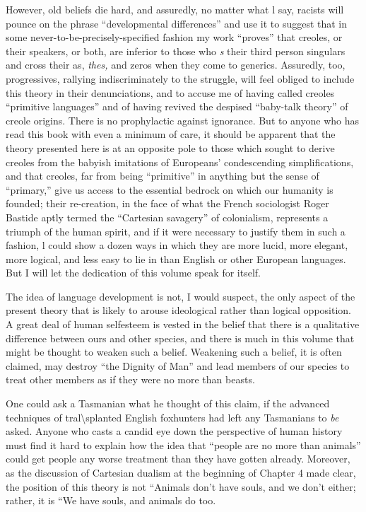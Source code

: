 However, old beliefs die hard, and assuredly, no matter what l say, racists will pounce on the phrase ``developmental differences'' and use it to suggest that in some never-to-be-precisely-specified fashion my work ``proves'' that creoles, or their speakers, or both, are inferior to those who \textit{s} their third person singulars and cross their as, \textit{thes,} and zeros when they come to generics. Assuredly, too, progressives, rallying indiscriminately to the struggle, will feel obliged to include this theory in their denunciations, and to accuse me of having called creoles ``primi\-tive languages'' and of having revived the despised ``baby-talk theory'' of creole origins. There is no prophylactic against ignorance. But to anyone who has read this book with even a minimum of care, it should
be apparent that the theory presented here is at an opposite pole to those which sought to derive creoles from the babyish imitations of Europeans' condescending simplifications, and that creoles, far from being ``primitive'' in anything but the sense of ``primary,'' give us access to the essential bedrock on which our humanity is founded; their re-creation, in the face of what the French sociologist Roger Bastide aptly termed the ``Cartesian savagery'' of colonialism, repre\-sents a triumph of the human spirit, and if it were necessary to justify them in such a fashion, l could show a dozen ways in which they are more lucid, more elegant, more logical, and less easy to lie in than English or other European languages. But I will let the dedication of this volume speak for itself.

The idea of language development is not, I would suspect, the only aspect of the present theory that is likely to arouse ideological rather than logical opposition. A great deal of human self{\textquotedbl}esteem is vested in the belief that there is a qualitative difference between ours and other species, and there is much in this volume that might be thought to weaken such a belief. Weakening such a belief, it is often claimed, may destroy ``the Dignity of Man'' and lead members of our species to treat other members as if they were no more than beasts.

One could ask a Tasmanian what he thought of this claim, if the advanced techniques of tral{\textbackslash}splanted English foxhunters had
left any Tasmanians to \textit{be} asked. Anyone who casts a candid eye down the perspective of human history must find it hard to explain how the idea that ``people are no more than animals'' could get people any worse treatment than they have gotten already. Moreover, as the discussion of Cartesian dualism at the beginning of Chapter 4 made clear, the position of this theory is not ``Animals don't have souls, and we don't either{\textquotedbl}; rather, it is ``We have souls, and animals do too.{\textquotedbl}

